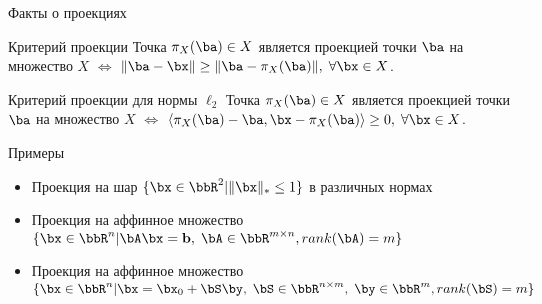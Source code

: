 \documentclass[12pt,russian]{beamer}
\begin{document}
\begin{frame}{Факты о проекциях}

\begin{block}{Критерий проекции}
Точка $\pi_X(\ba) \in X$ является проекцией точки $\ba$ на множество $X$ $\Leftrightarrow$ $\| \ba - \bx \| \geq \| \ba - \pi_X(\ba) \|, \; \forall \bx \in X$.
\end{block}

\begin{block}{Критерий проекции для нормы $\ell_2$}
Точка $\pi_X(\ba) \in X$ является проекцией точки $\ba$ на множество $X$ $\Leftrightarrow$ $\langle \pi_X(\ba) - \ba, \bx - \pi_X(\ba) \rangle \geq 0, \; \forall \bx \in X$.
\end{block}
\end{frame}

\begin{frame}{Примеры}
\begin{itemize}
\item Проекция на шар $\{\bx \in \bbR^2 | \| \bx \|_* \leq 1\}$ в различных нормах
\item Проекция на аффинное множество $\{ \bx \in \bbR^n | \bA\bx = \mathbf{b}, \; \bA \in \bbR^{m \times n}, rank(\bA) = m \}$
\item Проекция на аффинное множество $\{ \bx \in \bbR^n | \bx = \bx_0 + \bS\by, \; \bS \in \bbR^{n \times m}, \; \by \in \bbR^m, rank(\bS) = m \}$
\end{itemize}
\end{frame}
\end{document}

